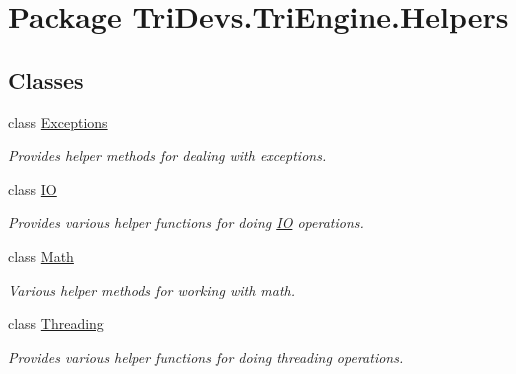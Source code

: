 \hypertarget{namespace_tri_devs_1_1_tri_engine_1_1_helpers}{\section{Package Tri\-Devs.\-Tri\-Engine.\-Helpers}
\label{namespace_tri_devs_1_1_tri_engine_1_1_helpers}
}
\subsection*{Classes}
\begin{DoxyCompactItemize}
\item 
class \hyperlink{class_tri_devs_1_1_tri_engine_1_1_helpers_1_1_exceptions}{Exceptions}
\begin{DoxyCompactList}\small\item\em Provides helper methods for dealing with exceptions. \end{DoxyCompactList}\item 
class \hyperlink{class_tri_devs_1_1_tri_engine_1_1_helpers_1_1_i_o}{I\-O}
\begin{DoxyCompactList}\small\item\em Provides various helper functions for doing \hyperlink{class_tri_devs_1_1_tri_engine_1_1_helpers_1_1_i_o}{I\-O} operations. \end{DoxyCompactList}\item 
class \hyperlink{class_tri_devs_1_1_tri_engine_1_1_helpers_1_1_math}{Math}
\begin{DoxyCompactList}\small\item\em Various helper methods for working with math. \end{DoxyCompactList}\item 
class \hyperlink{class_tri_devs_1_1_tri_engine_1_1_helpers_1_1_threading}{Threading}
\begin{DoxyCompactList}\small\item\em Provides various helper functions for doing threading operations. \end{DoxyCompactList}\end{DoxyCompactItemize}

